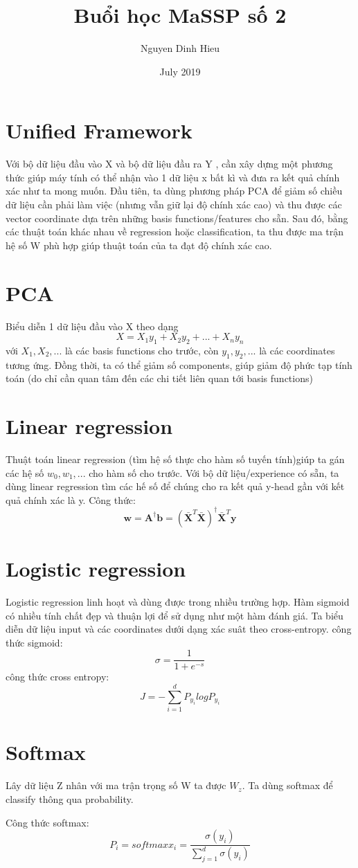 \documentclass{article}
\title{Buổi học MaSSP số 2}
\date{July 2019}
\begin{document}
\maketitle
\author{Nguyen Dinh Hieu}

\section{Unified Framework}


\textrm{Với bộ dữ liệu đầu vào X và bộ dữ liệu đầu ra Y , cần xây dựng một phương thức giúp máy tính có thể nhận vào 1 dữ liệu x bất kì và đưa ra kết quả chính xác như ta mong muốn. 
Đầu tiên, ta dùng phương pháp PCA để giảm số chiều dữ liệu cần phải làm việc (nhưng vẫn giữ lại độ chính xác cao) và thu được các vector coordinate dựa trên những basis functions/features cho sẵn. Sau đó, bằng các thuật toán khác nhau về regression hoặc classification, ta thu được ma trận hệ số W phù hợp giúp thuật toán của ta đạt độ chính xác cao. }

\section{PCA}
\textrm{Biểu diễn 1 dữ liệu đầu vào X theo dạng
$$X = X_1 y_1 + X_2 y_2  + ... + X_n y_n $$
với {$X_1 , X_2, ...$} là các basis functions cho trước, còn {$y_1, y_2, ...$} là các coordinates tương ứng. Đồng thời, ta có thể giảm số components, giúp giảm độ phức tạp tính toán (do chỉ cần quan tâm đến các chi tiết liên quan tới basis functions)}

\section{Linear regression}
Thuật toán linear regression (tìm hệ số thực cho hàm số tuyến tính)giúp ta gán các hệ số {$w_0, w_1,...$} cho hàm số cho trước. Với bộ dữ liệu/experience có sẵn, ta dùng linear regression tìm các hế số để chúng cho ra kết quả y-head gần với kết quả chính xác là y.
Công thức:
$$\mathbf{w} = \mathbf{A}^{\dagger}\mathbf{b} = (\mathbf{\bar{X}}^T\mathbf{\bar{X}})^{\dagger} \mathbf{\bar{X}}^T\mathbf{y}$$

\section{Logistic regression}
Logistic regression linh hoạt và dùng được trong nhiều trường hợp. Hàm sigmoid có nhiều tính chất đẹp và thuận lợi để sử dụng như một hàm đánh giá. Ta biểu diễn dữ liệu input và các coordinates dưới dạng xác suât theo cross-entropy.
công thức sigmoid:
$$\sigma = \frac{1}{1+e^{-s}}$$
công thức cross entropy:
$$ J = -\sum_{i=1} ^{d} P_y_i logP_y_i $$

\section{Softmax}
 Lây dữ liệu Z nhân với ma trận trọng số W ta được $W_z$. Ta dùng softmax để classify thông qua probability.

Công thức softmax: 
$$P_i = softmax x_i = \frac{\sigma (y_i)}{\sum_{j=1}^{d}\sigma(y_i)}$$
\end{document}
